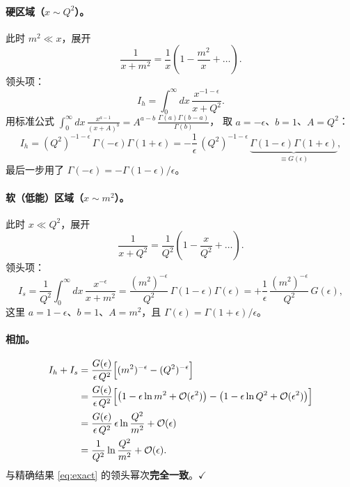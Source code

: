 \documentclass[UTF8,a4paper,11pt]{ctexart}
\theoremstyle{definition}
\theoremstyle{remark}
\theoremstyle{plain}
\begin{document}
\paragraph{硬区域（$x\sim Q^2$）。}此时 $m^2\ll x$，展开
\begin{equation}
  \frac{1}{x+m^2}=\frac1x\left(1-\frac{m^2}{x}+\dots\right).
\end{equation}
领头项：
\begin{equation}
  I_h=\int_0^\infty\! dx\,\frac{x^{-1-\epsilon}}{x+Q^2} .
\end{equation}
用标准公式
$\int_0^\infty dx\,\frac{x^{a-1}}{(x+A)^b}=A^{a-b}\,\frac{\Gamma(a)\Gamma(b-a)}{\Gamma(b)}$，
取 $a=-\epsilon$、$b=1$、$A=Q^2$：
\begin{equation}
  I_h=(Q^2)^{-1-\epsilon}\,\Gamma(-\epsilon)\Gamma(1+\epsilon)
     =-\frac{1}{\epsilon}\,(Q^2)^{-1-\epsilon}\,
      \underbrace{\Gamma(1-\epsilon)\Gamma(1+\epsilon)}_{\displaystyle \equiv G(\epsilon)} ,
  \label{eq:Ih}
\end{equation}
最后一步用了 $\Gamma(-\epsilon)=-\Gamma(1-\epsilon)/\epsilon$。

\paragraph{软（低能）区域（$x\sim m^2$）。}此时 $x\ll Q^2$，展开
\begin{equation}
  \frac{1}{x+Q^2}=\frac{1}{Q^2}\left(1-\frac{x}{Q^2}+\dots\right).
\end{equation}
领头项：
\begin{equation}
  I_s=\frac{1}{Q^2}\int_0^\infty\! dx\,\frac{x^{-\epsilon}}{x+m^2}
     =\frac{(m^2)^{-\epsilon}}{Q^2}\,\Gamma(1-\epsilon)\Gamma(\epsilon)
     =+\frac{1}{\epsilon}\,\frac{(m^2)^{-\epsilon}}{Q^2}\,G(\epsilon) ,
  \label{eq:Is}
\end{equation}
这里 $a=1-\epsilon$、$b=1$、$A=m^2$，且 $\Gamma(\epsilon)=\Gamma(1+\epsilon)/\epsilon$。

\paragraph{相加。}
\begin{align}
  I_h+I_s
  &=\frac{G(\epsilon)}{\epsilon\,Q^2}
    \Big[(m^2)^{-\epsilon}-(Q^2)^{-\epsilon}\Big]
   \notag\\
  &=\frac{G(\epsilon)}{\epsilon\,Q^2}
    \Big[\big(1-\epsilon\ln m^2+\mathcal O(\epsilon^2)\big)
        -\big(1-\epsilon\ln Q^2+\mathcal O(\epsilon^2)\big)\Big]
   \notag\\
  &=\frac{G(\epsilon)}{\epsilon\,Q^2}\,
    \epsilon\ln\frac{Q^2}{m^2}+\mathcal O(\epsilon)
   \notag\\
  &=\frac{1}{Q^2}\ln\frac{Q^2}{m^2}+\mathcal O(\epsilon).
  \label{eq:regionsum}
\end{align}
与精确结果 \eqref{eq:exact} 的领头幂次\textbf{完全一致}。$\checkmark$
\end{document}
